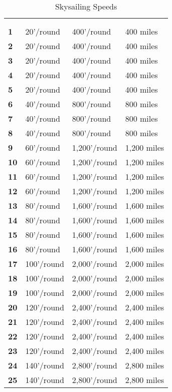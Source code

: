 \begin{multicols*}{2}
\begin {table}[H]
	\caption{Skysailing Speeds}\label{tab:Skysailing Speeds}
	\begin{tabularx}{\columnwidth}{>{\bfseries}M{.8in}YYY}
	\thead{} &  \thead{} & \\
	 &  &  & \\
	1 & 20’/round & 400’/round & 400 miles\\
	2 & 20’/round & 400’/round & 400 miles\\
	3 & 20’/round & 400’/round & 400 miles\\
	4 & 20’/round & 400’/round & 400 miles\\
	5 & 20’/round & 400’/round & 400 miles\\
	6 & 40’/round & 800’/round & 800 miles\\
	7 & 40’/round & 800’/round & 800 miles\\
	8 & 40’/round & 800’/round & 800 miles\\
	9 & 60’/round & 1,200’/round & 1,200 miles\\
	10 & 60’/round & 1,200’/round & 1,200 miles\\
	11 & 60’/round & 1,200’/round & 1,200 miles\\
	12 & 60’/round & 1,200’/round & 1,200 miles\\
	13 & 80’/round & 1,600’/round & 1,600 miles\\
	14 & 80’/round & 1,600’/round & 1,600 miles\\
	15 & 80’/round & 1,600’/round & 1,600 miles\\
	16 & 80’/round & 1,600’/round & 1,600 miles\\
	17 & 100’/round & 2,000’/round & 2,000 miles\\
	18 & 100’/round & 2,000’/round & 2,000 miles\\
	19 & 100’/round & 2,000’/round & 2,000 miles\\
	20 & 120’/round & 2,400’/round & 2,400 miles\\
	21 & 120’/round & 2,400’/round & 2,400 miles\\
	22 & 120’/round & 2,400’/round & 2,400 miles\\
	23 & 120’/round & 2,400’/round & 2,400 miles\\
	24 & 140’/round & 2,800’/round & 2,800 miles\\
	25 & 140’/round & 2,800’/round & 2,800 miles\\

\end{tabularx}
\end{table}
\end{multicols*}
